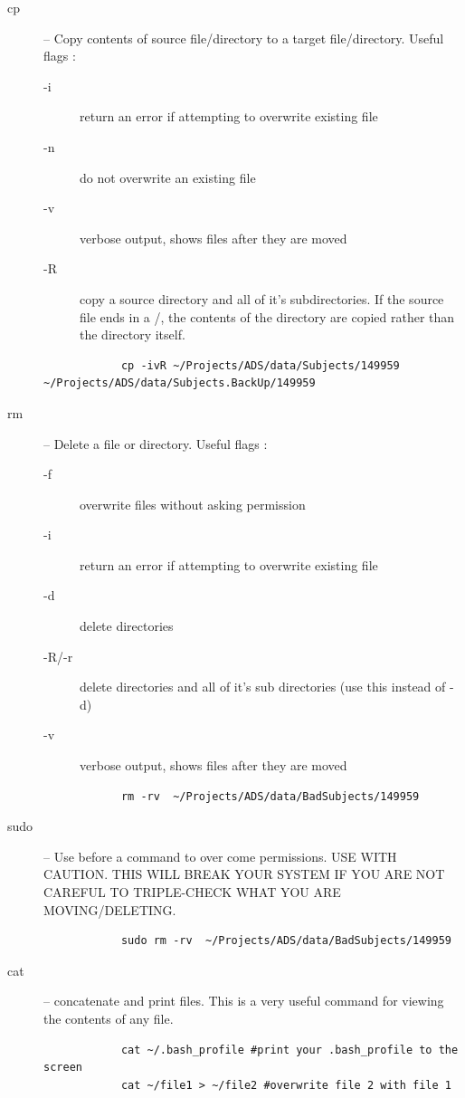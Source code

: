 \documentclass[paper=a4, fontsize=11pt]{scrartcl} %
\numberwithin{equation}{section} %
\numberwithin{figure}{section} %
\numberwithin{table}{section} %
\begin{document}
\begin{appendices}
\begin{description}
\item[cp] -- Copy contents of source file/directory to a target file/directory.  Useful flags :
			\begin{description}
			\item[-i] return an error if attempting to overwrite existing file
			\item[-n] do not overwrite an existing file 
			\item[-v] verbose output, shows files after they are moved
			\item[-R] copy a source directory and all of it's subdirectories.  If the source file ends in a /, the contents of the directory are copied rather than the directory itself.
			\end{description}
			\begin{lstlisting}
			cp -ivR ~/Projects/ADS/data/Subjects/149959 ~/Projects/ADS/data/Subjects.BackUp/149959
			\end{lstlisting}								
\item[rm] -- Delete a file or directory.  Useful flags :
			\begin{description}
			\item[-f] overwrite files without asking permission
			\item[-i] return an error if attempting to overwrite existing file
			\item[-d] delete directories
			\item[-R/-r] delete directories and all of it's sub directories (use this instead of -d)
			\item[-v] verbose output, shows files after they are moved
			\end{description}
			\begin{lstlisting}
			rm -rv  ~/Projects/ADS/data/BadSubjects/149959
			\end{lstlisting}								
\item[sudo] -- Use before a command to over come permissions.  USE WITH CAUTION.  THIS WILL BREAK YOUR SYSTEM IF YOU ARE NOT CAREFUL TO TRIPLE-CHECK WHAT  YOU ARE MOVING/DELETING.
			\begin{lstlisting}
			sudo rm -rv  ~/Projects/ADS/data/BadSubjects/149959
			\end{lstlisting}			
\item[cat] -- concatenate and print files.
			This is a very useful command for viewing the contents of any file.
			\begin{lstlisting}
			cat ~/.bash_profile #print your .bash_profile to the screen
			cat ~/file1 > ~/file2 #overwrite file 2 with file 1

\end{lstlisting}
\end{description}
\end{appendices}
\end{document}
